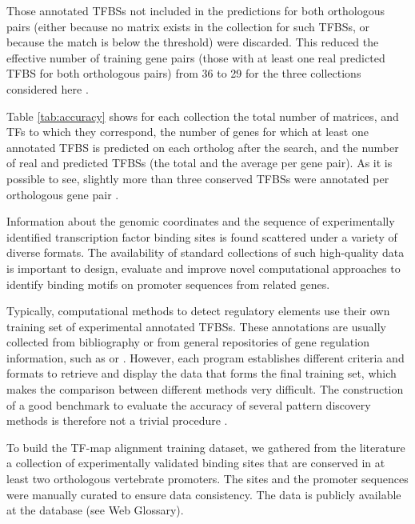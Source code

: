 Those annotated TFBSs not included in the predictions for both
orthologous pairs (either because no matrix exists in the collection
for such TFBSs, or because the match is below the threshold) were discarded. 
This reduced the effective number of training gene pairs (those with at least
one real predicted TFBS for both orthologous pairs) from 36 to 29 for the 
three collections considered here \citep{blanco:2006b}.

Table \ref{tab:accuracy} shows for each collection the total number of matrices, 
and TFs to which they correspond, the number of genes for which at least one 
annotated TFBS is predicted on each ortholog after the search, and the number 
of real and predicted TFBSs (the total and the average per gene pair). As it 
is possible to see, slightly more than three conserved TFBSs were annotated per
orthologous gene pair \citep{blanco:2006b}. 


Information about the genomic coordinates and the sequence of experimentally 
identified transcription factor binding sites is found scattered under a variety 
of diverse formats. The availability of standard collections of such high-quality 
data is important to design, evaluate and improve novel computational approaches to 
identify binding motifs on promoter sequences from related genes. 

Typically, computational methods to detect regulatory elements use their own training 
set of experimental annotated TFBSs. These annotations are usually collected from 
bibliography or from general repositories of gene regulation information, such as 
 \citep{sandelin:2004a} or  \citep{matys:2003a}. However, each program 
establishes different criteria and formats to retrieve and display the data that forms 
the final training set, which makes the comparison between different methods very 
difficult. The construction of a good benchmark to evaluate the accuracy of several 
pattern discovery methods is therefore not a trivial procedure \citep{tompa:2005a}.

To build the TF-map alignment training dataset, we gathered from the literature a 
collection of experimentally validated binding sites that are conserved in at least
two orthologous vertebrate promoters. The sites and the promoter 
sequences were manually curated to ensure data consistency. The data is publicly
available at the  database (see Web Glossary).  

